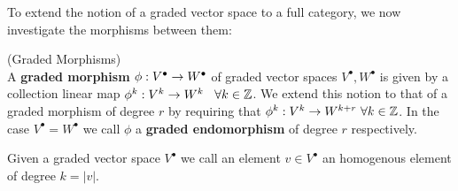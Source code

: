To extend the notion of a graded vector space to a full category, we now investigate the morphisms between them:

\begin{definition} (Graded Morphisms)\\
  A \textbf{graded morphism} $\phi: V^\bullet \ra W^\bullet$ of graded vector spaces $V^\bullet, W^\bullet$ is given by a collection linear map $\phi^k: V^k \ra W^k$ \ $\forall k \in \mathbb{Z}$. We extend this notion to that of a graded morphism of degree $r$ by requiring that $\phi^k: V^k \ra W^{k+r}\ \forall k \in \ZZ$. In the case $V^\bullet = W^\bullet$ we call $\phi$ a \textbf{graded endomorphism} of degree $r$ respectively.
\end{definition}

Given a graded vector space $V^\bullet$ we call an element $v\in V^\bullet$ an homogenous element of degree $k=|v|$.

